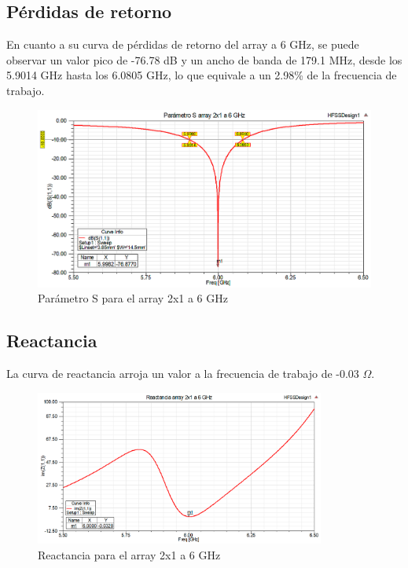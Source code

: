 \subsection{Pérdidas de retorno}
\par En cuanto a su curva de pérdidas de retorno del array a 6 GHz, se puede observar un valor pico de -76.78 dB y un ancho de banda de 179.1 MHz, desde los 5.9014 GHz hasta los 6.0805 GHz, lo que equivale a un 2.98\% de la frecuencia de trabajo.
\\
\begin{figure}[H]
    \centering
        \includegraphics[width=\textwidth]{archivos/analisis/2x12/1}
        \caption{Parámetro S para el array 2x1 a 6 GHz}
        \label{fig:s2x12}
\end{figure}

\newpage
\subsection{Reactancia}
\par La curva de reactancia arroja un valor a la frecuencia de trabajo de -0.03 $\Omega$. 
\\
\begin{figure}[H]
    \centering
        \includegraphics[width=0.85\textwidth]{archivos/analisis/2x12/2}
        \caption{Reactancia para el array 2x1 a 6 GHz}
        \label{fig:react2x12}
\end{figure}

